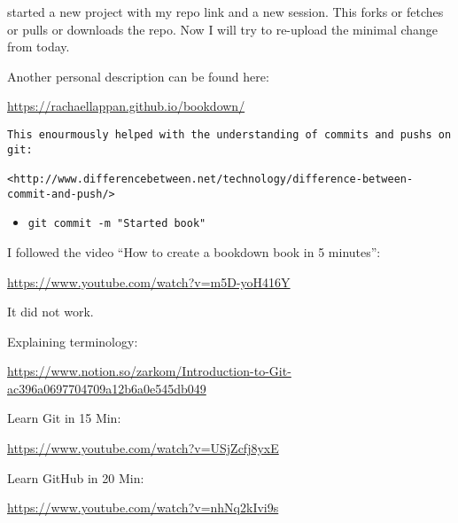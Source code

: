 \documentclass[
]{book}
\providecommand{\tightlist}{%
  \setlength{\itemsep}{0pt}\setlength{\parskip}{0pt}}
\begin{document}
started a new project with my repo link and a new session. This forks or fetches or pulls or downloads the repo. Now I will try to re-upload the minimal change from today.

Another personal description can be found here:

\url{https://rachaellappan.github.io/bookdown/}

\begin{verbatim}
This enourmously helped with the understanding of commits and pushs on git:

<http://www.differencebetween.net/technology/difference-between-commit-and-push/>
\end{verbatim}

\begin{itemize}
\tightlist
\item
  \texttt{git\ commit\ -m\ "Started\ book"}
\end{itemize}

I followed the video ``How to create a bookdown book in 5 minutes'':

\url{https://www.youtube.com/watch?v=m5D-yoH416Y}

It did not work.

Explaining terminology:

\url{https://www.notion.so/zarkom/Introduction-to-Git-ac396a0697704709a12b6a0e545db049}

Learn Git in 15 Min:

\url{https://www.youtube.com/watch?v=USjZcfj8yxE}

Learn GitHub in 20 Min:

\url{https://www.youtube.com/watch?v=nhNq2kIvi9s}

  
\end{document}
